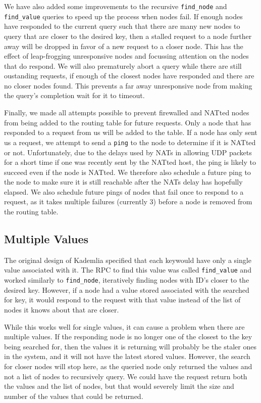 \documentclass[conference]{IEEEtran}
\begin{document}
We have also added some improvements to the recursive
\texttt{find\_node} and \texttt{find\_value} queries to speed up the
process when nodes fail. If enough nodes have responded to the
current query such that there are many new nodes to query that are
closer to the desired key, then a stalled request to a node further
away will be dropped in favor of a new request to a closer node.
This has the effect of leap-frogging unresponsive nodes and
focussing attention on the nodes that do respond. We will also
prematurely abort a query while there are still oustanding requests,
if enough of the closest nodes have responded and there are no
closer nodes found. This prevents a far away unresponsive node from
making the query's completion wait for it to timeout.

Finally, we made all attempts possible to prevent firewalled and
NATted nodes from being added to the routing table for future
requests. Only a node that has responded to a request from us will
be added to the table. If a node has only sent us a request, we
attempt to send a \texttt{ping} to the node to determine if it is
NATted or not. Unfortunately, due to the delays used by NATs in
allowing UDP packets for a short time if one was recently sent by
the NATted host, the ping is likely to succeed even if the node is
NATted. We therefore also schedule a future ping to the node to make
sure it is still reachable after the NATs delay has hopefully
elapsed. We also schedule future pings of nodes that fail once to
respond to a request, as it takes multiple failures (currently 3)
before a node is removed from the routing table.

\subsection{Multiple Values}
\label{multiple_values}

The original design of Kademlia specified that each keywould have
only a single value associated with it. The RPC to find this value
was called \texttt{find\_value} and worked similarly to
\texttt{find\_node}, iteratively finding nodes with ID's closer to
the desired key. However, if a node had a value stored associated
with the searched for key, it would respond to the request with that
value instead of the list of nodes it knows about that are closer.

While this works well for single values, it can cause a problem when
there are multiple values. If the responding node is no longer one
of the closest to the key being searched for, then the values it is
returning will probably be the staler ones in the system, and it
will not have the latest stored values. However, the search for
closer nodes will stop here, as the queried node only returned the
values and not a list of nodes to recursively query. We could have
the request return both the values and the list of nodes, but that
would severely limit the size and number of the values that could be
returned.
\end{document}
